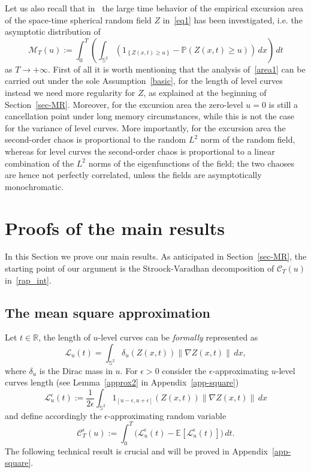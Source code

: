 \documentclass[10pt]{amsart}
\theoremstyle{definition}\newtheorem{defi}[theo]{Definition}\newtheorem{rema}[theo]{Remark}\newtheorem{exam}[theo]{Example}\newtheorem{exem}[theo]{Example}\newtheorem{nota}[theo]{Notation}
\newcommand{\clC}{\mathcal{C}}
\newcommand{\clL}{\mathcal{L}}
\newcommand{\bbS}{\mathbb{S}}
\newcommand{\bbR}{\mathbb{R}}
\newcommand{\bbP}{\mathbb{P}}
\newcommand{\bbE}{\mathbb{E}}
\begin{document}
Let us also recall that in~\cite{MRV:20} the large time behavior of the empirical excursion area of the space-time spherical random field $Z$ in~\eqref{eq1} has been investigated, i.e. the asymptotic distribution of
\begin{equation}\label{area1}
\mathcal{M}_T(u) := \int_0^T \left (\int_{\bbS^2}\left(1_{\left\{ Z(x,t)\ge u\right\}} - \bbP(Z(x,t)\ge u)\right)\,dx\right)\,dt
\end{equation}
as $T\to +\infty$. First of all it is worth mentioning that the analysis of~\eqref{area1} can be carried out under the sole Assumption~\ref{basic}, for the length of level curves instead we need more regularity for $Z$, as explained at the beginning of Section~\ref{sec-MR}. Moreover, for the excursion area the zero-level $u=0$ is still a cancellation point under long memory circumstances, while this is not the case for the variance of level curves. More importantly, for the excursion area the second-order chaos is proportional to the random $L^2$ norm of the random field, whereas for level curves the second-order chaos is proportional to a linear combination of the $L^2$ norms of the eigenfunctions of the field; the two chaoses are hence not perfectly correlated, unless the fields are asymptotically monochromatic.

\section{Proofs of the main results}
\label{secProofsMR}

In this Section we prove our main results. As anticipated in Section~\ref {sec-MR}, the starting point of our argument is the Stroock-Varadhan decomposition of $\clC_T(u)$ in~\eqref{rap_int}.

\subsection{The mean square approximation}\label{sect4.1}

Let $t\in \bbR$, the length of $u$-level curves can be \emph{formally} represented as
\begin{equation*}
\clL_u(t) = \int_{\bbS^2} \delta_u(Z(x,t)) \| \nabla Z(x,t)\|\,dx,
\end{equation*}
where $\delta_u$ is the Dirac mass in $u$. For $\epsilon >0$ consider the $
\epsilon$-approximating $u$-level curves length (see Lemma~\ref{approx2} in Appendix~\ref{app-square})
\begin{equation}\label{Leps}
\clL_u^\epsilon(t) := \frac{1}{2\epsilon}\int_{\bbS^2} 1_{\left[u-\epsilon,u+ \epsilon\right]}(Z(x,t)) \| \nabla Z(x,t)\|\,dx
\end{equation}
and define accordingly the $\epsilon$-approximating random variable
\begin{equation}\label{Ceps}
\clC^\epsilon_T(u) := \int_0^T \big(\clL_u^\epsilon(t) -
\bbE\left[\clL_u^\epsilon(t)\right]\big)\,dt.
\end{equation}
The following technical result is crucial and will be proved in Appendix~\ref {app-square}.
\end{document}
